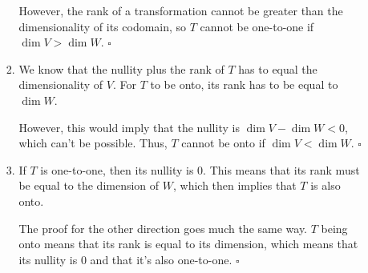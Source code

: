 \documentclass[12pt]{article}
\begin{document}
\begin{enumerate}
\begin{enumerate}
\begin{enumerate}
                              However, the rank of a transformation cannot be greater than the dimensionality
                              of its codomain, so $T$ cannot be one-to-one if $\dim V > \dim W$. $\square$
                        \item We know that the nullity plus the rank of $T$ has to equal the dimensionality of $V$.
                              For $T$ to be onto, its rank has to be equal to $\dim W$.

                              However, this would imply that the nullity is $\dim V - \dim W < 0$, which can't be possible.
                              Thus, $T$ cannot be onto if $\dim V < \dim W$. $\square$
                        \item If $T$ is one-to-one, then its nullity is $0$.
                              This means that its rank must be equal to the dimension of $W$, which then implies that $T$ is also onto.

                              The proof for the other direction goes much the same way.
                              $T$ being onto means that its rank is equal to its dimension,
                              which means that its nullity is $0$ and that it's also one-to-one. $\square$
                    \end{enumerate}
          \end{enumerate}
\end{enumerate}
\end{document}
